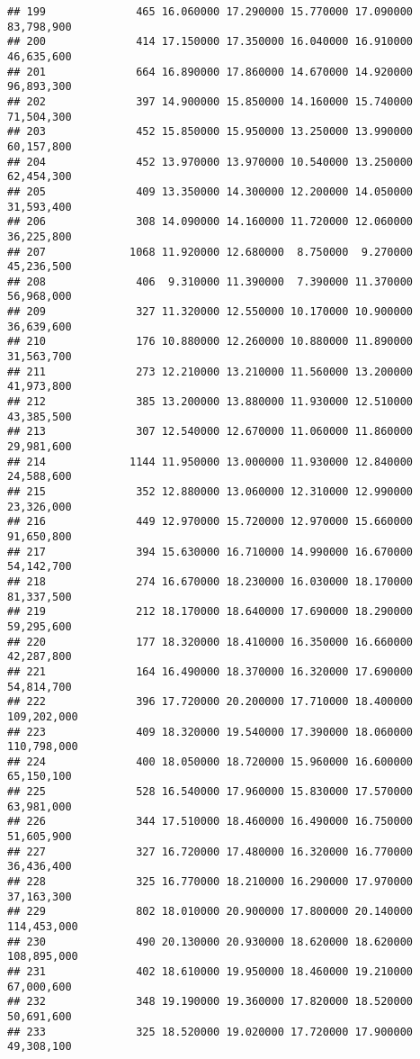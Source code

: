 \documentclass[]{article}
\begin{document}
\begin{verbatim}
## 199              465 16.060000 17.290000 15.770000 17.090000  83,798,900
## 200              414 17.150000 17.350000 16.040000 16.910000  46,635,600
## 201              664 16.890000 17.860000 14.670000 14.920000  96,893,300
## 202              397 14.900000 15.850000 14.160000 15.740000  71,504,300
## 203              452 15.850000 15.950000 13.250000 13.990000  60,157,800
## 204              452 13.970000 13.970000 10.540000 13.250000  62,454,300
## 205              409 13.350000 14.300000 12.200000 14.050000  31,593,400
## 206              308 14.090000 14.160000 11.720000 12.060000  36,225,800
## 207             1068 11.920000 12.680000  8.750000  9.270000  45,236,500
## 208              406  9.310000 11.390000  7.390000 11.370000  56,968,000
## 209              327 11.320000 12.550000 10.170000 10.900000  36,639,600
## 210              176 10.880000 12.260000 10.880000 11.890000  31,563,700
## 211              273 12.210000 13.210000 11.560000 13.200000  41,973,800
## 212              385 13.200000 13.880000 11.930000 12.510000  43,385,500
## 213              307 12.540000 12.670000 11.060000 11.860000  29,981,600
## 214             1144 11.950000 13.000000 11.930000 12.840000  24,588,600
## 215              352 12.880000 13.060000 12.310000 12.990000  23,326,000
## 216              449 12.970000 15.720000 12.970000 15.660000  91,650,800
## 217              394 15.630000 16.710000 14.990000 16.670000  54,142,700
## 218              274 16.670000 18.230000 16.030000 18.170000  81,337,500
## 219              212 18.170000 18.640000 17.690000 18.290000  59,295,600
## 220              177 18.320000 18.410000 16.350000 16.660000  42,287,800
## 221              164 16.490000 18.370000 16.320000 17.690000  54,814,700
## 222              396 17.720000 20.200000 17.710000 18.400000 109,202,000
## 223              409 18.320000 19.540000 17.390000 18.060000 110,798,000
## 224              400 18.050000 18.720000 15.960000 16.600000  65,150,100
## 225              528 16.540000 17.960000 15.830000 17.570000  63,981,000
## 226              344 17.510000 18.460000 16.490000 16.750000  51,605,900
## 227              327 16.720000 17.480000 16.320000 16.770000  36,436,400
## 228              325 16.770000 18.210000 16.290000 17.970000  37,163,300
## 229              802 18.010000 20.900000 17.800000 20.140000 114,453,000
## 230              490 20.130000 20.930000 18.620000 18.620000 108,895,000
## 231              402 18.610000 19.950000 18.460000 19.210000  67,000,600
## 232              348 19.190000 19.360000 17.820000 18.520000  50,691,600
## 233              325 18.520000 19.020000 17.720000 17.900000  49,308,100

\end{verbatim}
\end{document}
